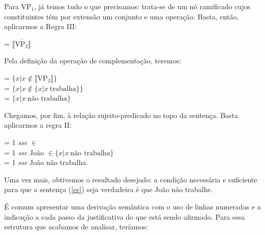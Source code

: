 \n Para VP$_{1}$, já temos tudo o que precisamos: trata-se de um nó ramificado cujos constituintes têm por extensão um conjunto e uma operação. Basta, então, aplicarmos a Regra III:

\begin{exe}
	\ex {} = $\overline{\llbracket \text{VP}_{2} \rrbracket}$
\end{exe}

\n Pela definição da operação de complementação, teremos:

\begin{exe}
	\ex {} = $\{x | x \not\in \llbracket \text{VP}_{2} \rrbracket \}$ \\
	 = $\{x | x \not\in \{x | x\ \text{trabalha}\} \}$ \\
	 = $\{x | x\ \text{não trabalha}\}$
\end{exe}

\n Chegamos, por fim, à relação sujeito-predicado no topo da sentença. Basta aplicarmos a regra II:

\begin{exe}
	\ex {} = 1 \textit{sse}  $\in$ 	 \\
		 = 1 \textit{sse} João $\in \{x | x\ \text{não trabalha}\}$ \\
		 = 1 \textit{sse} João não trabalha.
\end{exe}


\n Uma vez mais, obtivemos o resultado desejado: a condição
necessária e suficiente para que a sentença (\ref{ec}) seja
verdadeira é que João não trabalhe.

É comum apresentar uma derivação semântica com o uso de linhas numeradas e a indicação a cada passo da
justificativa do que está sendo afirmado. Para essa estrutura que acabamos de analisar, teríamos:

